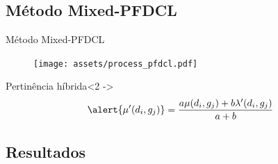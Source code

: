 \documentclass[brazil]{beamer}
\begin{document}
\subsection{Método Mixed-PFDCL}
\begin{frame}{Método Mixed-PFDCL}
  \begin{figure}[!htp] 
    \centering
    \texttt{[image: assets/process\_pfdcl.pdf]} 
  \end{figure}

  \begin{alertblock}{Pertinência híbrida}<2 ->
    \begin{equation}
      \alert{\mu'(d_i,g_j)} = \frac{a \mu(d_i,g_j) + b \lambda'(d_i,g_j)}{a+b}
      \label{eq:pfcmmix}
    \end{equation}
  \end{alertblock}

\end{frame}

\subsection{Resultados}
\end{document}

